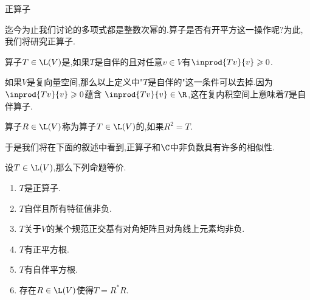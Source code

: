\documentclass{ctexart}
\begin{document}
\pagestyle{empty}
\begin{center}\large 正算子\end{center}
迄今为止我们讨论的多项式都是整数次幂的.算子是否有开平方这一操作呢?为此,我们将研究正算子.\\
\begin{definition}[1.1 定义:正算子]
    算子$T\in\L(V)$是,如果$T$是自伴的且对任意$v\in V$有$\inprod{Tv}{v}\geqslant0$.
\end{definition}\noindent
如果$V$是复向量空间,那么以上定义中"$T$是自伴的"这一条件可以去掉.因为$\inprod{Tv}{v}\geqslant0$蕴含%
$\inprod{Tv}{v}\in\R$,这在复内积空间上意味着$T$是自伴算子.
\begin{definition}[1.2 定义:平方根]
    算子$R\in\L(V)$称为算子$T\in\L(V)$的,如果$R^2=T$.
\end{definition}\noindent
于是我们将在下面的叙述中看到,正算子和$\C$中非负数具有许多的相似性.\\
\begin{formal}[2.1 正算子的性质I]
    设$T\in\L(V)$,那么下列命题等价.
    \begin{enumerate}[label=\tbf{(\alph*)}]
        \item $T$是正算子.
        \item $T$自伴且所有特征值非负.
        \item $T$关于$V$的某个规范正交基有对角矩阵且对角线上元素均非负.
        \item $T$有正平方根.
        \item $T$有自伴平方根.
        \item 存在$R\in\L(V)$使得$T=R^*R$.
    \end{enumerate}
\end{formal}
\end{document}
